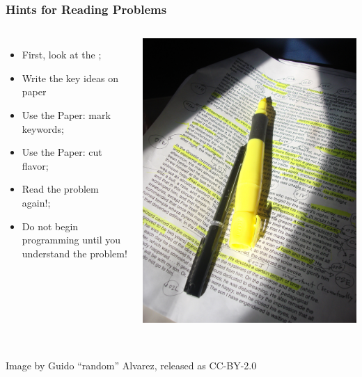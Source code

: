 \begin{frame}
  \frametitle{Hints for Reading Problems}

  \begin{columns}
    {\small
    \begin{itemize}
    \item First, look at the ;
    \item Write the key ideas on paper
    \item Use the Paper: mark keywords;
    \item Use the Paper: cut flavor;
    \item \alert{Read the problem again!};
    \item \alert{Do not begin programming until you understand the problem!}
    \end{itemize}
    }
    \includegraphics[width=\textwidth]{../img/textmarker}
  \end{columns}

  \vfill

  \hrulefill\\
  \hfill {\tiny Image by Guido ``random'' Alvarez, released as CC-BY-2.0}

\end{frame}

